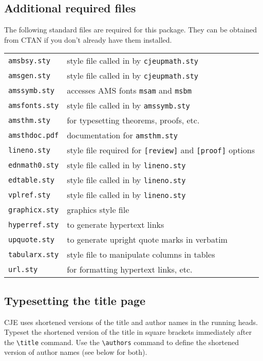 \documentclass{cje}          %
\theoremstyle{plain}%
\theoremstyle{definition}
\theoremstyle{remark}
\begin{document}
\subsection{Additional required files}
The following standard files are required for this package. They can be obtained from CTAN if you don't already have them installed.\\[0.5\baselineskip]
\begin{tabular}{@{}ll}
\texttt{amsbsy.sty}        & style file called in by \texttt{cjeupmath.sty}\\
\texttt{amsgen.sty}        & style file called in by \texttt{cjeupmath.sty}\\
\texttt{amssymb.sty}       & accesses AMS fonts \texttt{msam} and \texttt{msbm}\\
\texttt{amsfonts.sty}      & style file called in by \texttt{amssymb.sty}\\
\texttt{amsthm.sty}        & for typesetting theorems, proofs, etc.\\
\texttt{amsthdoc.pdf}      & documentation for \texttt{amsthm.sty}\\
\texttt{lineno.sty}        & style file required for \verb"[review]" and \verb"[proof]" options\\
\texttt{ednmath0.sty}      & style file called in by \texttt{lineno.sty}\\
\texttt{edtable.sty}       & style file called in by \texttt{lineno.sty}\\
\texttt{vplref.sty}        & style file called in by \texttt{lineno.sty}\\
\texttt{graphicx.sty}      & graphics style file\\
\texttt{hyperref.sty}      & to generate hypertext links\\
\texttt{upquote.sty}       & to generate upright quote marks in verbatim\\
\texttt{tabularx.sty}      & style file to manipulate columns in tables\\
\texttt{url.sty}           & for formatting hypertext links, etc.
\end{tabular}

\subsection{Typesetting the title page}

CJE uses shortened versions of the title and author names in the running heads. Typeset the shortened version of the title in square brackets immediately after the \verb"\title" command. Use the \verb"\authors" command  to define the shortened version of author names (see below for both). 
\end{document}
